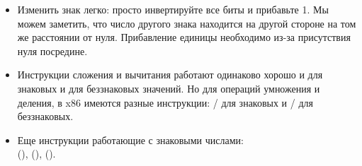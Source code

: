 \begin{itemize}
	.

\label{sec:signednumbers:negation}
\item Изменить знак легко: просто инвертируйте все биты и прибавьте 1.
Мы можем заметить, что число другого знака находится на другой стороне на том же расстоянии от нуля.
Прибавление единицы необходимо из-за присутствия нуля посредине.

\item Инструкции сложения и вычитания работают одинаково хорошо и для знаковых и для беззнаковых значений.
	Но для операций умножения и деления, в x86 имеются разные инструкции:
	/ для знаковых и / для беззнаковых.

\item Еще инструкции работающие с знаковыми числами:\\
	 (),  (),  ().
\end{itemize}

